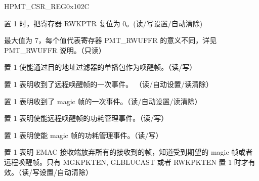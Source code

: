 \begin{register}{H}{PMT\_CSR\_REG}{0x102C}\label{regdesc:PMT_CSRREG}
%
%
%
%
%
%
%
%
%
%
%
%
\regnewline%
\begin{regdesc}\begin{reglist}
\item [RWKFILTRST] 置 1 时，把寄存器 RWKPTR 复位为 0。(读/写设置/自动清除)
\item [RWKPTR] 最大值为 7，每个值代表寄存器 PMT\_RWUFFR 的意义不同，详见 PMT\_RWUFFR 说明。（只读）
\item [GLBLUCAST] 置 1 使能通过目的地址过滤器的单播包作为唤醒帧。（读/写）
\item [RWKPRCVD] 置 1 表明收到了远程唤醒帧的一次事件。 （读/自动设置/读清除）
\item [MGKPRCVD]  置 1 表明收到了 magic 帧的一次事件。（读/自动设置/读清除）
\item [RWKPKTEN] 置 1 表明使能远程唤醒帧的功耗管理事件。（读/写）
\item [MGKPKTEN] 置 1 表明使能 magic 帧的功耗管理事件。（读/写）
\item [PWRDWN] 置 1 表明 EMAC 接收端放弃所有的接收到的帧，知道受到期望的 magic 帧或者远程唤醒帧。只有 MGKPKTEN, GLBLUCAST 或者 RWKPKTEN 置 1 时才有效。（读/写设置/自动清除）


\end{reglist}\end{regdesc}
\end{register}


